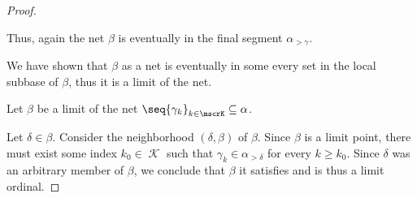 \begin{proof}
\begin{itemize}
    Thus, again the net \( \beta \) is eventually in the final segment \( \alpha_{>\gamma} \).
  \end{itemize}

   We have shown that \( \beta \) as a net is eventually in some every set in the local subbase of \( \beta \), thus it is a limit of the net.

   \NecessitySubProof Let \( \beta \) be a limit of the net \( \seq{ \gamma_k }_{k \in \mscrK} \subseteq \alpha \).

   Let \( \delta \in \beta \). Consider the neighborhood \( (\delta, \beta) \) of \( \beta \). Since \( \beta \) is a limit point, there must exist some index \( k_0 \in \mscrK \) such that \( \gamma_k \in \alpha_{>\delta} \) for every \( k \geq k_0 \). Since \( \delta \) was an arbitrary member of \( \beta \), we conclude that \( \beta \) it satisfies  and is thus a limit ordinal.
\end{proof}
